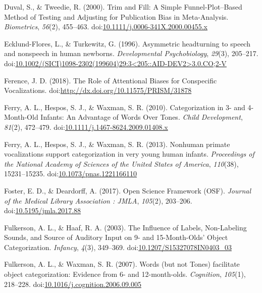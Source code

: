 \documentclass[man]{apa6}
\begin{document}
\hypertarget{ref-duval_trim_2000}{}
Duval, S., \& Tweedie, R. (2000). Trim and Fill: A Simple
Funnel-Plot--Based Method of Testing and Adjusting for Publication Bias
in Meta-Analysis. \emph{Biometrics}, \emph{56}(2), 455--463.
doi:\href{https://doi.org/10.1111/j.0006-341X.2000.00455.x}{10.1111/j.0006-341X.2000.00455.x}

\hypertarget{ref-ecklund-flores_asymmetric_1996}{}
Ecklund-Flores, L., \& Turkewitz, G. (1996). Asymmetric headturning to
speech and nonspeech in human newborns. \emph{Developmental
Psychobiology}, \emph{29}(3), 205--217.
doi:\href{https://doi.org/10.1002/(SICI)1098-2302(199604)29:3\%3C205::AID-DEV2\%3E3.0.CO;2-V}{10.1002/(SICI)1098-2302(199604)29:3\textless{}205::AID-DEV2\textgreater{}3.0.CO;2-V}

\hypertarget{ref-ference_role_2018}{}
Ference, J. D. (2018). The Role of Attentional Biases for Conspecific
Vocalizations.
doi:\href{https://doi.org/http://dx.doi.org/10.11575/PRISM/31878}{http://dx.doi.org/10.11575/PRISM/31878}

\hypertarget{ref-ferry_categorization_2010}{}
Ferry, A. L., Hespos, S. J., \& Waxman, S. R. (2010). Categorization in
3- and 4-Month-Old Infants: An Advantage of Words Over Tones.
\emph{Child Development}, \emph{81}(2), 472--479.
doi:\href{https://doi.org/10.1111/j.1467-8624.2009.01408.x}{10.1111/j.1467-8624.2009.01408.x}

\hypertarget{ref-ferry_nonhuman_2013}{}
Ferry, A. L., Hespos, S. J., \& Waxman, S. R. (2013). Nonhuman primate
vocalizations support categorization in very young human infants.
\emph{Proceedings of the National Academy of Sciences of the United
States of America}, \emph{110}(38), 15231--15235.
doi:\href{https://doi.org/10.1073/pnas.1221166110}{10.1073/pnas.1221166110}

\hypertarget{ref-foster_open_2017}{}
Foster, E. D., \& Deardorff, A. (2017). Open Science Framework (OSF).
\emph{Journal of the Medical Library Association : JMLA}, \emph{105}(2),
203--206.
doi:\href{https://doi.org/10.5195/jmla.2017.88}{10.5195/jmla.2017.88}

\hypertarget{ref-fulkerson_influence_2003}{}
Fulkerson, A. L., \& Haaf, R. A. (2003). The Influence of Labels,
Non-Labeling Sounds, and Source of Auditory Input on 9- and
15-Month-Olds' Object Categorization. \emph{Infancy}, \emph{4}(3),
349--369.
doi:\href{https://doi.org/10.1207/S15327078IN0403_03}{10.1207/S15327078IN0403\_03}

\hypertarget{ref-fulkerson_words_2007}{}
Fulkerson, A. L., \& Waxman, S. R. (2007). Words (but not Tones)
facilitate object categorization: Evidence from 6- and 12-month-olds.
\emph{Cognition}, \emph{105}(1), 218--228.
doi:\href{https://doi.org/10.1016/j.cognition.2006.09.005}{10.1016/j.cognition.2006.09.005}
\end{document}
